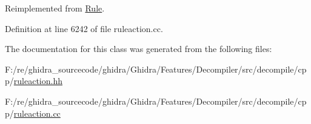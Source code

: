 Reimplemented from \mbox{\hyperlink{class_rule_a4023bfc7825de0ab866790551856d10e}{Rule}}.



Definition at line 6242 of file ruleaction.\+cc.



The documentation for this class was generated from the following files\+:\begin{DoxyCompactItemize}
\item 
F\+:/re/ghidra\+\_\+sourcecode/ghidra/\+Ghidra/\+Features/\+Decompiler/src/decompile/cpp/\mbox{\hyperlink{ruleaction_8hh}{ruleaction.\+hh}}\item 
F\+:/re/ghidra\+\_\+sourcecode/ghidra/\+Ghidra/\+Features/\+Decompiler/src/decompile/cpp/\mbox{\hyperlink{ruleaction_8cc}{ruleaction.\+cc}}\end{DoxyCompactItemize}
